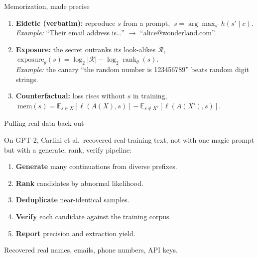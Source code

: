 \documentclass[12pt,aspectratio=169,handout]{beamer}
\begin{document}
\begin{frame}{Memorization, made precise}
\begin{enumerate}
	\setlength{\itemsep}{0.55em}
	\item \textbf{Eidetic (verbatim):} reproduce $s$ from a prompt, $\ s = \arg\max_{s'} h(s'\mid c)$.\\
	{\footnotesize \emph{Example:} ``Their email address is\ldots'' $\rightarrow$ ``alice@wonderland.com''.}
	\item \textbf{Exposure:} the secret outranks its look-alikes $\mathcal{R}$, $\ \mathrm{exposure}_\theta(s) = \log_2|\mathcal{R}| - \log_2 \operatorname{rank}_\theta(s)$.\\
	{\footnotesize \emph{Example:} the canary ``the random number is 123456789'' beats random digit strings.}
	\item \textbf{Counterfactual:} loss rises without $s$ in training, $\ \mathrm{mem}(s) = \mathbb{E}_{s\in X}[\ell(A(X),s)] - \mathbb{E}_{s\notin X'}[\ell(A(X'),s)]$.\\
\end{enumerate}
\end{frame}


\begin{frame}{Pulling real data back out}
On GPT-2, Carlini et al.\ recovered real training text, not with one magic prompt but with a \alert{generate, rank, verify} pipeline:

\begin{enumerate}\small
	\setlength{\itemsep}{0.12em}
	\item \textbf{Generate} many continuations from diverse prefixes.
	\item \textbf{Rank} candidates by abnormal likelihood.
	\item \textbf{Deduplicate} near-identical samples.
	\item \textbf{Verify} each candidate against the training corpus.
	\item \textbf{Report} precision and extraction yield.
\end{enumerate}

\vspace{0.2em}
{\footnotesize Recovered real names, emails, phone numbers, API keys.}
\end{frame}
\end{document}
